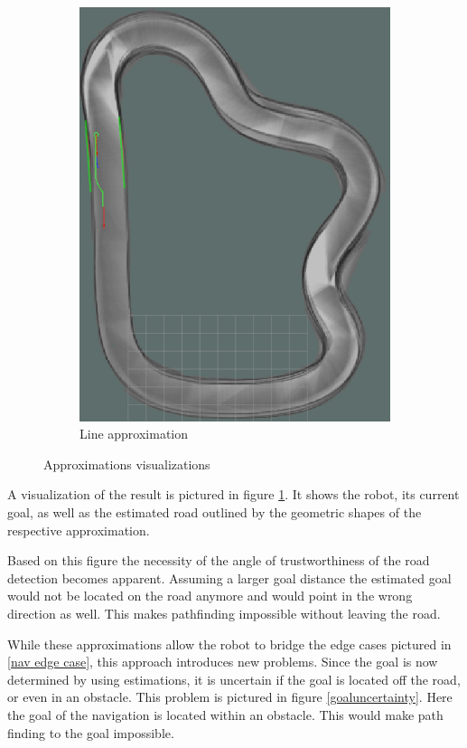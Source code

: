 \begin{figure}[H]
\begin{subfigure}{.45\linewidth}
		\includegraphics[width=\textwidth]{Pictures/lineapprox}
		\caption{Line approximation}
	\end{subfigure}

	\caption{Approximations visualizations}
	\label{aproxvis}

\end{figure}

A visualization of the result is pictured in figure \ref{aproxvis}.
It shows the robot, its current goal, as well as the estimated road outlined by the geometric shapes of the respective approximation.

Based on this figure the necessity of the angle of trustworthiness of the road detection becomes apparent. Assuming a larger goal distance the estimated goal would not be located on the road anymore and would point in the wrong direction as well. This makes pathfinding impossible without leaving the road.


While these approximations allow the robot to bridge the edge cases pictured in \ref{nav edge case}, this approach introduces new problems. Since the goal is now determined by using estimations, it is uncertain if the goal is located off the road, or even in an obstacle. This problem is pictured in figure \ref{goaluncertainty}. Here the goal of the navigation is located within an obstacle. This would make path finding to the goal impossible.\\

